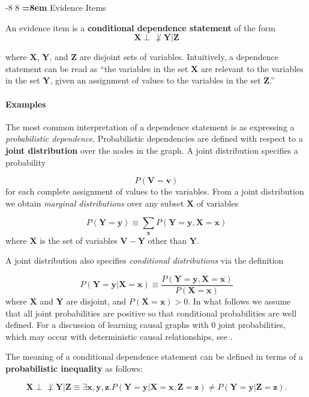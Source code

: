 \documentclass{elsarticle}%
\makeatletter
\renewcommand\subsection{\@startsection {subsection}{1}{\z@}%
  {-8\p@ \@plus -4\p@ \@minus -4\p@}%
                       {8\p@ \@plus 4\p@ \@minus 4\p@}%
                                   {\normalfont\large\bfseries\boldmath
                                   \rightskip=\z@ \@plus 8em\pretolerance=10000 }}
\newcommand{\set}[1]{\mathbf{#1}}
\newcommand{\dep}{\ensuremath{{\perp{}\!\!\!\!\!\!\!\not  \perp{}}}}
\newcommand{\V}{\mathbf{V}}
\newcommand{\X}{X}
\newcommand{\Y}{Y}
\newcommand{\Z}{Z}
\newcommand{\x}{x}
\newcommand{\y}{y}
\newcommand{\z}{z}
\makeatother
\begin{document}
\subsection{Evidence Items}

An evidence item is a \textbf{conditional dependence statement} of the form 
\begin{equation} \label{eq:dependence}
\set{X} \dep \set{Y}|\set{Z}
\end{equation}

where $\set{X}$, $\set{Y}$, and $\set{Z}$ are disjoint sets of variables. Intuitively, a dependence statement can be read as ``the variables in the set $\set{\X}$ are relevant to the variables in the set $\set{\Y}$, given an assignment of values to the variables in the set $\set{\Z}$.'' 

\paragraph{Examples} 
The most common  interpretation of a dependence statement is as expressing a {\em probabilistic dependence}. Probabilistic dependencies are defined with respect to a \textbf{joint distribution} over the nodes in the graph. A joint distribution specifies a probability 

$$P(\V=\set{v})$$
for each complete assignment of values to the variables. From a joint distribution we obtain {\em marginal distributions} over any subset $\set{X}$ of variables

$$P(\set{\Y} = \set{y}) \equiv \sum_{\set{x}} P(\set{\Y} = \set{y},\set{\X} = \set{\x})$$
where $\set{\X}$ is the set of variables $\V - \set{\Y}$ other than $\set{\Y}$. 

A joint distribution also specifies {\em conditional distributions} via the definition

$$P(\set{\Y} = \set{\y}|\set{\X} = \set{\x}) \equiv \frac{P(\set{\Y} = \set{\y},\set{\X} = \set{\x})}{P(\set{\X} = \set{\x})}$$
where $\set{\X}$ and $\set{\Y}$ are disjoint, and $P(\set{\X} = \set{\x}) >0$. In what follows we assume that all joint probabilities are positive so that conditional probabilities are well defined. For a discussion of learning causal graphs with 0 joint probabilities, which may occur with deterministic causal relationships, see \cite{Luo2006a}.

The meaning of a conditional dependence statement can be defined in terms of a \textbf{probabilistic inequality} as follows:

\begin{equation} \label{eq:prob-ineq-variables} \set{X} \dep \set{Y}|\set{Z} \equiv \exists \set{\x},\set{\y},\set{\z}.P(\set{\Y} = \set{\y}|\set{\X} = \set{\x},\set{Z} = \set{z}) \neq P(\set{\Y} = \set{\y}|\set{Z} = \set{z}).
\end{equation}
\end{document}
